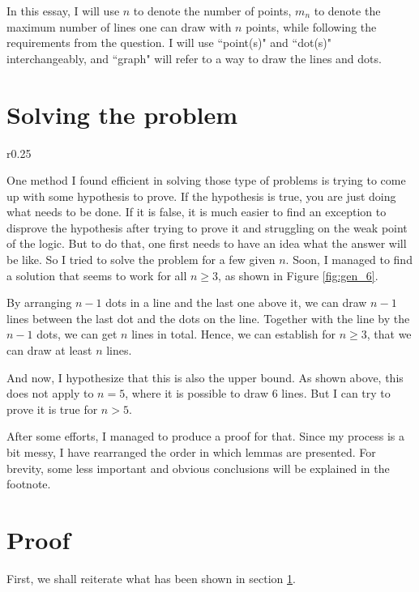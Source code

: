 \documentclass[a4paper, 12pt]{article}
\begin{document}
In this essay, I will use $n$ to denote the number of points, $m_n$ to denote the maximum number of lines one can draw with $n$ points, while following the requirements from the question. I will use ``point(s)" and ``dot(s)" interchangeably, and ``graph" will refer to a way to draw the lines and dots.
\clearpage

\section{Solving the problem}\label{section:start}
\begin{wrapfigure}{r}{0.25\textwidth}
    
    \caption{general solution with $n=6$}
    \label{fig:gen_6}
\end{wrapfigure}
One method I found efficient in solving those type of problems is trying to come up with some hypothesis to prove. If the hypothesis is true, you are just doing what needs to be done. If it is false, it is much easier to find an exception to disprove the hypothesis after trying to prove it and struggling on the weak point of the logic. But to do that, one first needs to have an idea what the answer will be like. So I tried to solve the problem for a few given $n$. Soon, I managed to find a solution that seems to work for all $n\geq 3$, as shown in Figure \ref{fig:gen_6}.

By arranging $n-1$ dots in a line and the last one above it, we can draw $n-1$ lines between the last dot and the dots on the line. Together with the line by the $n-1$ dots, we can get $n$ lines in total. Hence, we can establish for $n\geq 3$, that we can draw at least $n$ lines.

And now, I hypothesize that this is also the upper bound. As shown above, this does not apply to $n=5$, where it is possible to draw 6 lines. But I can try to prove it is true for $n>5$.

After some efforts, I managed to produce a proof for that. Since my process is a bit messy, I have rearranged the order in which lemmas are presented. For brevity, some less important and obvious conclusions will be explained in the footnote.

\section{Proof}

First, we shall reiterate what has been shown in section \ref{section:start}.
\end{document}
